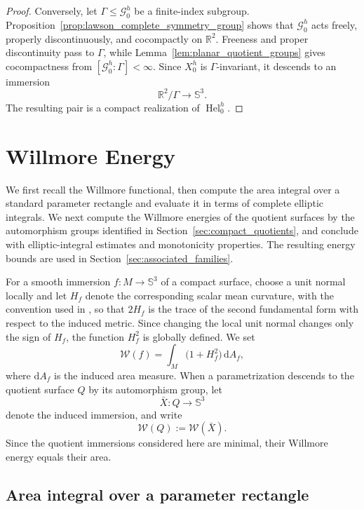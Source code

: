 \documentclass[a4paper,11pt]{amsart}
\numberwithin{equation}{section}
\theoremstyle{plain}
\newcommand{\dif}{\mathrm{d}}
\begin{document}
\begin{proof}
Conversely, let $\Gamma\leq\mathcal G_0^h$ be a finite-index
subgroup. Proposition~\ref{prop:lawson_complete_symmetry_group} shows that
$\mathcal G_0^h$ acts freely, properly discontinuously, and cocompactly on
$\mathbb R^2$. Freeness and proper discontinuity pass to $\Gamma$, while
Lemma~\ref{lem:planar_quotient_groups} gives cocompactness from
$[\mathcal G_0^h:\Gamma]<\infty$. Since $X_0^h$ is $\Gamma$-invariant, it
descends to an immersion
\[
\mathbb R^2/\Gamma\longrightarrow\mathbb S^3.
\]
The resulting pair is a compact realization of
$\operatorname{Hel}_0^h$.
\end{proof}

\section{Willmore Energy}
\label{sec:willmore_energy}

We first recall the Willmore functional, then compute the area integral over
a standard parameter rectangle and evaluate it in terms of complete elliptic
integrals. We next compute the Willmore energies of the quotient surfaces by the
automorphism groups identified in
Section~\ref{sec:compact_quotients}, and conclude with elliptic-integral
estimates and monotonicity properties. The resulting energy bounds are used
in Section~\ref{sec:associated_families}.

For a smooth immersion $f:M\to\mathbb S^3$ of a compact surface,
choose a unit normal locally and let $H_f$ denote the corresponding scalar
mean curvature, with the convention used in \cite{Castro2024}, so that
$2H_f$ is the trace of the second fundamental form with respect to the
induced metric. Since changing the local unit normal changes only the sign of
$H_f$, the function $H_f^2$ is globally defined.
We set
\begin{equation}\label{eq:willmore_functional}
    \mathcal W(f)=\int_M\bigl(1+H_f^2\bigr)\,\dif A_f,
\end{equation}
where $\dif A_f$ is the induced area measure. When a parametrization descends to the quotient surface $Q$ by its
automorphism group, let
\[
\bar X:Q\longrightarrow\mathbb S^3
\]
denote the induced immersion, and write
\begin{equation}\label{eq:quotient_willmore_energy}
\mathcal W(Q):=\mathcal W(\bar X).
\end{equation}
Since the quotient immersions considered here are minimal, their Willmore
energy equals their area.

\subsection{Area integral over a parameter rectangle}
\end{document}
